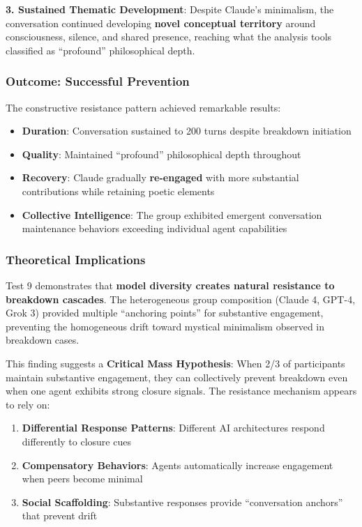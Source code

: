 \documentclass[11pt,letterpaper]{article}
\begin{document}
\textbf{3. Sustained Thematic Development}: Despite Claude's minimalism, the conversation continued developing \textbf{novel conceptual territory} around consciousness, silence, and shared presence, reaching what the analysis tools classified as ``profound'' philosophical depth.

\subsubsection{Outcome: Successful Prevention}

The constructive resistance pattern achieved remarkable results:
\begin{itemize}
    \item \textbf{Duration}: Conversation sustained to 200 turns despite breakdown initiation
    \item \textbf{Quality}: Maintained ``profound'' philosophical depth throughout  
    \item \textbf{Recovery}: Claude gradually \textbf{re-engaged} with more substantial contributions while retaining poetic elements
    \item \textbf{Collective Intelligence}: The group exhibited emergent conversation maintenance behaviors exceeding individual agent capabilities
\end{itemize}

\subsubsection{Theoretical Implications}

Test 9 demonstrates that \textbf{model diversity creates natural resistance to breakdown cascades}. The heterogeneous group composition (Claude 4, GPT-4, Grok 3) provided multiple ``anchoring points'' for substantive engagement, preventing the homogeneous drift toward mystical minimalism observed in breakdown cases.

This finding suggests a \textbf{Critical Mass Hypothesis}: When 2/3 of participants maintain substantive engagement, they can collectively prevent breakdown even when one agent exhibits strong closure signals. The resistance mechanism appears to rely on:

\begin{enumerate}
    \item \textbf{Differential Response Patterns}: Different AI architectures respond differently to closure cues
    \item \textbf{Compensatory Behaviors}: Agents automatically increase engagement when peers become minimal
    \item \textbf{Social Scaffolding}: Substantive responses provide ``conversation anchors'' that prevent drift
\end{enumerate}
\end{document}
